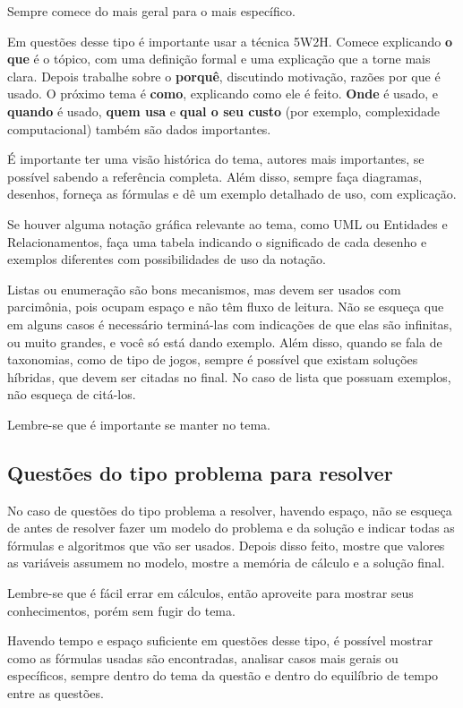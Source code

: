 \documentclass{article}
\begin{document}
Sempre comece do mais geral para o mais específico. 

Em questões desse tipo é importante usar a técnica 5W2H. Comece explicando \textbf{o que} é o tópico, com uma definição formal e uma explicação que a torne mais clara. Depois trabalhe sobre o \textbf{porquê}, discutindo motivação, razões por que é usado. O próximo tema é \textbf{como}, explicando como ele é feito. \textbf{Onde} é usado, e \textbf{quando} é usado, \textbf{quem usa} e \textbf{qual o seu custo} (por exemplo, complexidade computacional) também são dados importantes. 

É importante ter uma visão histórica do tema, autores mais importantes, se possível sabendo a referência completa. Além disso, sempre faça diagramas, desenhos, forneça as fórmulas e dê um exemplo detalhado de uso, com explicação. 

Se houver alguma notação gráfica relevante ao tema, como UML ou Entidades e Relacionamentos, faça uma tabela indicando o significado de cada desenho e exemplos diferentes com possibilidades de uso da notação.

Listas ou enumeração são bons mecanismos, mas devem ser usados com parcimônia, pois ocupam espaço e não têm fluxo de leitura. Não se esqueça que em alguns casos é necessário terminá-las com indicações de que elas são infinitas, ou muito grandes, e você só está dando exemplo. Além disso, quando se fala de taxonomias, como de tipo de jogos, sempre é possível que existam soluções híbridas, que devem ser citadas no final. No caso de lista que possuam exemplos, não esqueça de citá-los.

Lembre-se que é importante se manter no tema.

\subsection{Questões do tipo problema para resolver}

No caso de questões do tipo problema a resolver, havendo espaço, não se esqueça de antes de resolver fazer um modelo do problema e da solução e indicar todas as fórmulas e algoritmos que vão ser usados.
Depois disso feito, mostre que valores as variáveis assumem no modelo, mostre a memória de cálculo e a solução final.

Lembre-se que é fácil errar em cálculos, então aproveite para mostrar seus conhecimentos, porém sem fugir do tema. 

Havendo tempo e espaço suficiente em questões desse tipo, é possível mostrar como as fórmulas usadas são encontradas, analisar casos mais gerais ou específicos, sempre dentro do tema da questão e dentro do equilíbrio de tempo entre as questões.
\end{document}
